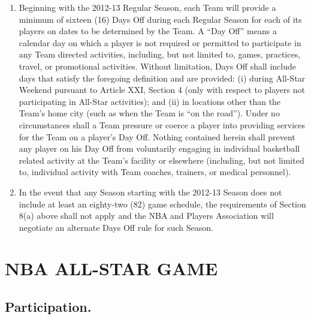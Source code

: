 \documentclass[
]{book}
\providecommand{\tightlist}{%
  \setlength{\itemsep}{0pt}\setlength{\parskip}{0pt}}
\begin{document}
\begin{enumerate}
\def\labelenumi{(\alph{enumi})}
\tightlist
\item
  Beginning with the 2012-13 Regular Season, each Team will provide a minimum of sixteen (16) Days Off during each Regular Season for each of its players on dates to be determined by the Team. A ``Day Off'' means a calendar day on which a player is not required or permitted to participate in any Team directed activities, including, but not limited to, games, practices, travel, or promotional activities. Without limitation, Days Off shall include days that satisfy the foregoing definition and are provided: (i) during All-Star Weekend pursuant to Article XXI, Section 4 (only with respect to players not participating in All-Star activities); and (ii) in locations other than the Team's home city (such as when the Team is ``on the road''). Under no circumstances shall a Team pressure or coerce a player into providing services for the Team on a player's Day Off. Nothing contained herein shall prevent any player on his Day Off from voluntarily engaging in individual basketball related activity at the Team's facility or elsewhere (including, but not limited to, individual activity with Team coaches, trainers, or medical personnel).
\item
  In the event that any Season starting with the 2012-13 Season does not include at least an eighty-two (82) game schedule, the requirements of Section 8(a) above shall not apply and the NBA and Players Association will negotiate an alternate Days Off rule for such Season.
\end{enumerate}

\hypertarget{nba-all-star-game}{%
\chapter{NBA ALL-STAR GAME}\label{nba-all-star-game}}

\hypertarget{participation.}{%
\section{Participation.}\label{participation.}}
\end{document}
